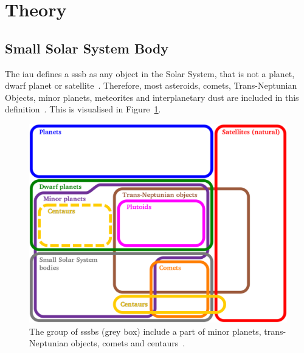 \section{Theory} \label{sec:theory}
%
%
%
%

\subsection{Small Solar System Body}
The \gls{iau} defines a \gls{sssb} as any object in the Solar System, that is not a planet, dwarf planet or satellite~\cite{iau_sssb}. Therefore, most asteroids, comets, Trans-Neptunian Objects, minor planets, meteorites and interplanetary dust are included in this definition~\cite{wiki:sssb}. This is visualised in Figure~\ref{fig:sssb_diagram}.

\begin{figure}[htb]
    \centering
    \includegraphics[width=.7\textwidth]{doc/thesis/0_figures/Euler_diagram_of_solar_system_bodies.png}
    \caption{The group of \glspl{sssb} (grey box) include a part of minor planets, trans-Neptunian objects, comets and centaurs~\cite{wiki:sssb}.}
    \label{fig:sssb_diagram}
\end{figure}

